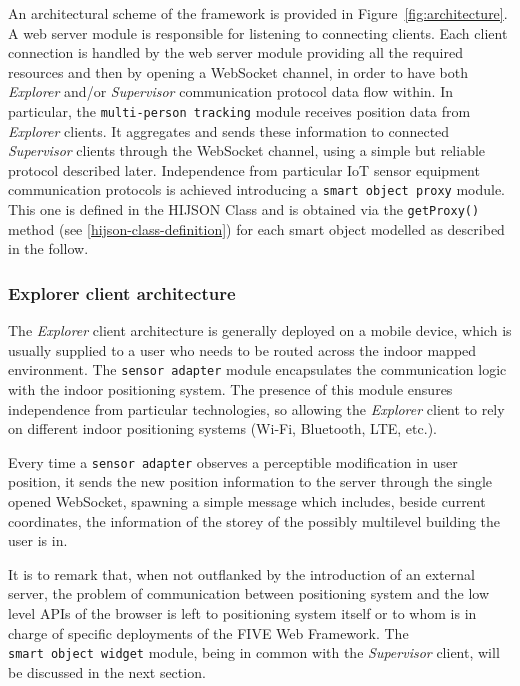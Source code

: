 An architectural scheme of the framework is provided in
Figure~\ref{fig:architecture}. A web server module is responsible for
listening to connecting clients. Each client connection is handled by the web
server module providing all the required resources and then by opening a
WebSocket channel, in order to have both \emph{Explorer} and/or
\emph{Supervisor} communication protocol data flow within. In particular, the
\texttt{multi-person\ tracking} module receives position data from
\emph{Explorer} clients. It aggregates and sends these information to
connected \emph{Supervisor} clients through the WebSocket channel, using a
simple but reliable protocol described later. Independence from particular IoT
sensor equipment communication protocols is achieved introducing a
\texttt{smart\ object\ proxy} module. This one is defined in the HIJSON Class
and is obtained via the \texttt{getProxy()} method (see \ref{hijson-class-definition}) 
for each smart object modelled as described in the follow.

\subsubsection{Explorer client architecture}\label{explorer-client-architecture}

The \emph{Explorer} client architecture is generally deployed on a mobile
device, which is usually supplied to a user who needs to be routed across the indoor mapped
environment. The \texttt{sensor\ adapter} module
encapsulates the communication logic with the indoor positioning system. The
presence of this module ensures independence from particular technologies, so
allowing the \emph{Explorer} client to rely on different indoor positioning
systems (Wi-Fi, Bluetooth, LTE, etc.).

Every time a \texttt{sensor\ adapter} observes a perceptible modification in
user position, it sends the new position information to the server through the
single opened WebSocket, spawning a simple message which includes, beside
current coordinates, the information of the storey of the possibly multilevel
building the user is in.

It is to remark that, when not outflanked by the introduction of an external
server, the problem of communication between positioning system and the low
level APIs of the browser is left to positioning system itself or to whom is
in charge of specific deployments of the FIVE Web Framework.
The \texttt{smart\ object\ widget} module, being in common with the
 \emph{Supervisor} client, will be discussed in the next section.

